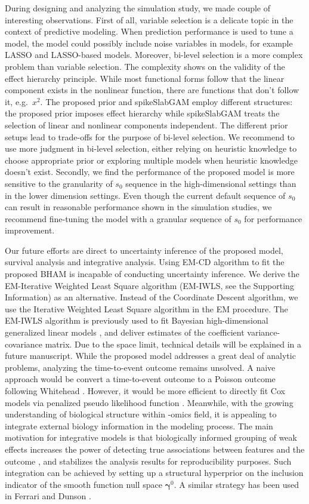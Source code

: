 \documentclass[AMA,STIX1COL,]{WileyNJD-v2}
\begin{document}
During designing and analyzing the simulation study, we made couple of
interesting observations. First of all, variable selection is a delicate
topic in the context of predictive modeling. When prediction performance
is used to tune a model, the model could possibly include noise
variables in models, for example LASSO and LASSO-based models.
\cite{Wu2019} Moreover, bi-level selection is a more complex problem
than variable selection. The complexity shows on the validity of the
effect hierarchy principle. While most functional forms follow that the
linear component exists in the nonlinear function, there are functions
that don't follow it, e.g.~\(x^2\). The proposed prior and spikeSlabGAM
employ different structures: the proposed prior imposes effect hierarchy
while spikeSlabGAM treats the selection of linear and nonlinear
components independent. The different prior setups lead to trade-offs
for the purpose of bi-level selection. We recommend to use more judgment
in bi-level selection, either relying on heuristic knowledge to choose
appropriate prior or exploring multiple models when heuristic knowledge
doesn't exist. Secondly, we find the performance of the proposed model
is more sensitive to the granularity of \(s_0\) sequence in the
high-dimensional settings than in the lower dimension settings. Even
though the current default sequence of \(s_0\) can result in reasonable
performance shown in the simulation studies, we recommend fine-tuning
the model with a granular sequence of \(s_0\) for performance
improvement.

Our future efforts are direct to uncertainty inference of the proposed
model, survival analysis and integrative analysis. Using EM-CD algorithm
to fit the proposed BHAM is incapable of conducting uncertainty
inference. We derive the EM-Iterative Weighted Least Square algorithm
(EM-IWLS, see the Supporting Information) as an alternative. Instead of
the Coordinate Descent algorithm, we use the Iterative Weighted Least
Square algorithm in the EM procedure. The EM-IWLS algorithm is
previously used to fit Bayesian high-dimensional generalized linear
models \cite{Yi2012}, and deliver estimates of the coefficient
variance-covariance matrix. Due to the space limit, technical details
will be explained in a future manuscript. While the proposed model
addresses a great deal of analytic problems, analyzing the time-to-event
outcome remains unsolved. A naive approach would be convert a
time-to-event outcome to a Poisson outcome following Whitehead
\citep{Whitehead1980}. However, it would be more efficient to directly
fit Cox models via penalized pseudo likelihood function
\citep{Simon2011}. Meanwhile, with the growing understanding of
biological structure within -omics field, it is appealing to integrate
external biology information in the modeling process. The main
motivation for integrative models is that biologically informed grouping
of weak effects increases the power of detecting true associations
between features and the outcome \citep{Peterson2016}, and stabilizes
the analysis results for reproducibility purposes. Such integration can
be achieved by setting up a structural hyperprior on the inclusion
indicator of the smooth function null space \(\boldsymbol{\gamma}^0\). A
similar strategy has been used in Ferrari and Dunson
\citep{Ferrari2020}.
\end{document}
